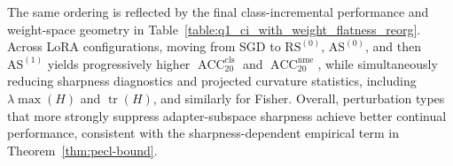 \documentclass{article}
\theoremstyle{plain}
\theoremstyle{definition}
\theoremstyle{remark}
\begin{document}
The same ordering is reflected by the final class-incremental performance and weight-space geometry in Table~\ref{table:q1_ci_with_weight_flatness_reorg}. Across LoRA configurations, moving from SGD to $\mathrm{RS}^{(0)}$, $\mathrm{AS}^{(0)}$, and then $\mathrm{AS}^{(1)}$ yields progressively higher $\operatorname{ACC}_{20}^{\mathrm{cls}}$ and $\operatorname{ACC}_{20}^{\mathrm{nme}}$, while simultaneously reducing sharpness diagnostics and projected curvature statistics, including $\lambda{\max}(H)$ and $\operatorname{tr}(H)$, and similarly for Fisher.
Overall, perturbation types that more strongly suppress adapter-subspace sharpness achieve better continual performance, consistent with the sharpness-dependent empirical term in Theorem~\ref{thm:pecl-bound}.
\end{document}
